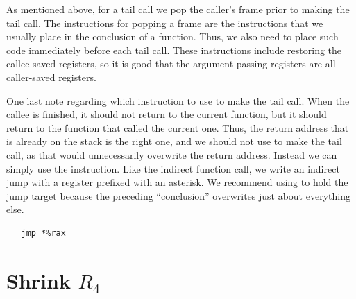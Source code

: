 \documentclass[11pt]{book}
\begin{document}
As mentioned above, for a tail call we pop the caller's frame prior to
making the tail call. The instructions for popping a frame are the
instructions that we usually place in the conclusion of a
function. Thus, we also need to place such code immediately before
each tail call. These instructions include restoring the callee-saved
registers, so it is good that the argument passing registers are all
caller-saved registers.

One last note regarding which instruction to use to make the tail
call. When the callee is finished, it should not return to the current
function, but it should return to the function that called the current
one. Thus, the return address that is already on the stack is the
right one, and we should not use  to make the tail call, as
that would unnecessarily overwrite the return address. Instead we can
simply use the  instruction. Like the indirect function call,
we write an indirect jump with a register prefixed with an asterisk.
We recommend using  to hold the jump target because the
preceding ``conclusion'' overwrites just about everything else.
\begin{lstlisting}
   jmp *%rax
\end{lstlisting}


\section{Shrink $R_4$}
\label{sec:shrink-r4}
\end{document}
